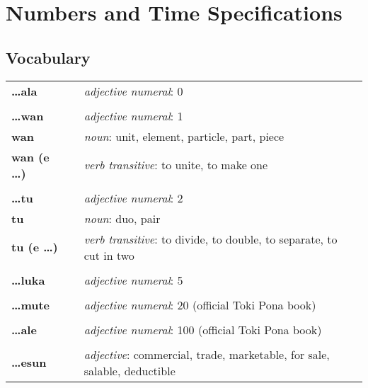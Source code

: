 \section{Numbers and Time Specifications}
%
%
\subsection*{Vocabulary}
%
\begin{supertabular}{p{2,5cm}|ll}
%
\textbf{\dots ala} && \textit{adjective numeral}: 0 \\ %
 && \\ %
%
\textbf{\dots wan} && \textit{adjective numeral}: 1 \\ %
\textbf{wan} && \textit{noun}: unit, element, particle, part, piece \\ %
\textbf{wan (e \dots)} && \textit{verb transitive}: to unite, to make one \\ %
 && \\ %
%
\textbf{\dots tu} && \textit{adjective numeral}: 2 \\ %
\textbf{tu} && \textit{noun}: duo, pair \\ %
\textbf{tu (e \dots)} && \textit{verb transitive}: to divide, to double, to separate, to cut in two \\ %
 && \\ %
%
\textbf{\dots luka} && \textit{adjective numeral}: 5 \\ %
 && \\ %
%
\textbf{\dots mute} && \textit{adjective numeral}: 20 (official Toki Pona book) \\ %
 && \\ %
%
\textbf{\dots ale} && \textit{adjective numeral}: 100 (official Toki Pona book) \\ %
 && \\ %
%
\textbf{\dots esun} && \textit{adjective}: commercial, trade, marketable, for sale, salable, deductible \\  %

\end{supertabular}
